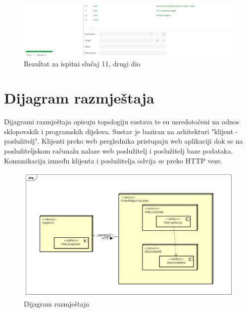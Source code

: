             \begin{figure}[H]
            					\includegraphics[scale=0.5]{dokumentacija/slike/selenium/containermanagement2.png}
            					\centering
            					\caption{Rezultat za ispitni slučaj 11, drugi dio}
            					\label{fig:test 11 p2}
            \end{figure}
			
			\eject 
		
		
		\section{Dijagram razmještaja}
			
			
			
			Dijagrami razmještaja opisuju topologiju sustava te su usredotočeni na odnos sklopovskih i programskih dijelova. Sustav je baziran na arhitekturi "klijent - poslužitelj". Klijenti preko web preglednika pristupaju web aplikaciji dok se na poslužiteljskom računalu nalaze web poslužitelj i poslužitelj baze podataka. Komunikacija između klijenta i poslužitelja odvija se preko HTTP veze.

			\begin{figure} [H]
			    \centering
			    \includegraphics[width=1.0\linewidth]{slike/Deployment_Diagram.png}
                \caption{Dijagram razmještaja}
                \label{fig:Dijagram razmještaja}
		    \end{figure}
			\eject
		
